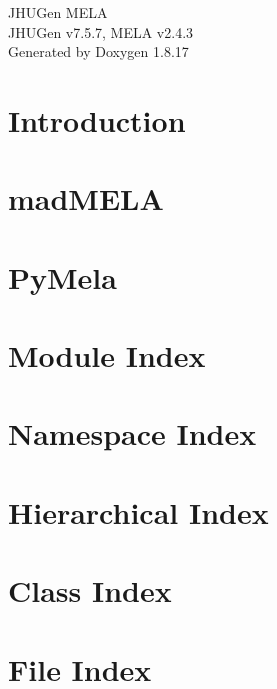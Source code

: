 \let\mypdfximage\pdfximage\def\pdfximage{\immediate\mypdfximage}\documentclass[twoside]{book}
\newcommand{\+}{\discretionary{\mbox{\scriptsize$\hookleftarrow$}}{}{}}
\newcommand{\clearemptydoublepage}{%
  \newpage{\pagestyle{empty}\cleardoublepage}%
}
\begin{document}
\hypersetup{pageanchor=false,
             bookmarksnumbered=true,
             pdfencoding=unicode
            }
\begin{titlepage}
\vspace*{7cm}
\begin{center}%
{\Large J\+H\+U\+Gen M\+E\+LA \\[1ex]\large J\+H\+U\+Gen v7.\+5.\+7, M\+E\+LA v2.\+4.\+3 }\\
\vspace*{1cm}
{\large Generated by Doxygen 1.8.17}\\
\end{center}
\end{titlepage}
\clearemptydoublepage
{}
\tableofcontents
\clearemptydoublepage
{}
\hypersetup{pageanchor=true}

\chapter{Introduction}
\label{index}\hypertarget{index}{}
\chapter{mad\+M\+E\+LA}
\label{madMELA}

\chapter{Py\+Mela}
\label{PyMela_page}

\chapter{Module Index}

\chapter{Namespace Index}

\chapter{Hierarchical Index}

\chapter{Class Index}

\chapter{File Index}

\end{document}
